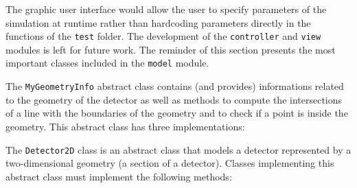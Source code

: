 \documentclass[11pt]{article}
\begin{document}
	The graphic user interface would allow the user to specify
	parameters of the simulation at runtime rather than hardcoding parameters
	directly in the functions of the \texttt{test} folder.
	The development of the \texttt{controller} and \texttt{view} modules
	is left for future work. The reminder of this section presents the most important classes
	included in the \texttt{model} module.

	The \texttt{MyGeometryInfo} abstract class contains (and provides) informations
	related to the
	geometry of the detector as well as methods to compute the intersections of a
	line with the boundaries of the geometry and to check if a point is inside
	the geometry. This abstract class has three implementations:





	The \texttt{Detector2D} class is an abstract class that models a detector
	represented by a two-dimensional geometry (a section of a detector). Classes
	implementing this abstract class must implement the following methods:
\end{document}
